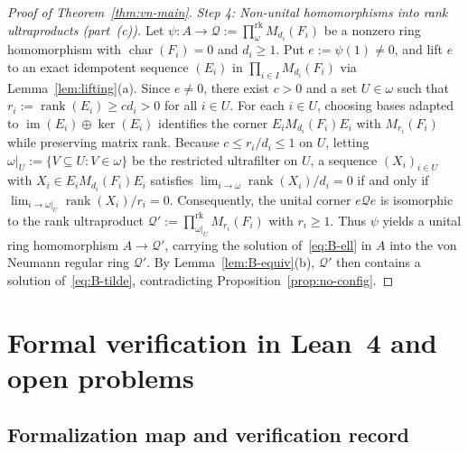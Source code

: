 \documentclass[11pt]{article}
\theoremstyle{definition}
\theoremstyle{remark}
\numberwithin{equation}{section}
\DeclareMathOperator{\rank}{rank}
\DeclareMathOperator{\im}{im}
\newcommand{\RUF}[3]{\prod_{#1}^{\mathrm{rk}} M_{#2}(#3)}
\newcommand{\1}{\mathbf{1}}
\begin{document}
\begin{proof}[Proof of Theorem~\ref{thm:vn-main}]
\emph{Step 4: Non-unital homomorphisms into rank ultraproducts (part~(c)).}
Let $\psi\colon A \to \mathcal{Q} := \RUF{\omega}{d_i}{F_i}$ be a nonzero ring homomorphism with $\operatorname{char}(F_i) = 0$ and $d_i \ge 1$. Put $e := \psi(1) \neq 0$, and lift $e$ to an exact idempotent sequence $(E_i)$ in $\prod_{i \in I} M_{d_i}(F_i)$ via Lemma~\ref{lem:lifting}(a). Since $e \neq 0$, there exist $c > 0$ and a set $U \in \omega$ such that $r_i := \rank(E_i) \ge c d_i > 0$ for all $i \in U$. For each $i \in U$, choosing bases adapted to $\im(E_i) \oplus \ker(E_i)$ identifies the corner $E_i M_{d_i}(F_i) E_i$ with $M_{r_i}(F_i)$ while preserving matrix rank. Because $c \le r_i / d_i \le 1$ on $U$, letting $\omega|_U := \{V \subseteq U : V \in \omega\}$ be the restricted ultrafilter on $U$, a sequence $(X_i)_{i \in U}$ with $X_i \in E_i M_{d_i}(F_i) E_i$ satisfies $\lim_{i \to \omega} \rank(X_i)/d_i = 0$ if and only if $\lim_{i \to \omega|_U} \rank(X_i)/r_i = 0$. Consequently, the unital corner $e\mathcal{Q}e$ is isomorphic to the rank ultraproduct $\mathcal{Q}' := \RUF{\omega|_U}{r_i}{F_i}$ with $r_i \ge 1$. Thus $\psi$ yields a unital ring homomorphism $A \to \mathcal{Q}'$, carrying the solution of~\eqref{eq:B-ell} in $A$ into the von Neumann regular ring $\mathcal{Q}'$. By Lemma~\ref{lem:B-equiv}(b), $\mathcal{Q}'$ then contains a solution of~\eqref{eq:B-tilde}, contradicting Proposition~\ref{prop:no-config}.
\end{proof}

\section{Formal verification in Lean~4 and open problems}
\label{sec:formal}

\subsection{Formalization map and verification record}
\end{document}
